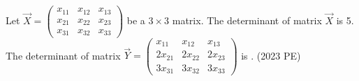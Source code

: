 \item 
Let $\vec{X} = 
\begin{pmatrix}
x_{11} & x_{12} & x_{13} \\
x_{21} & x_{22} & x_{23} \\
x_{31} & x_{32} & x_{33}
\end{pmatrix}
$ be a $3 \times 3$ matrix.
The determinant of matrix $\vec{X}$ is 5.
The determinant of matrix $\vec{Y} = 
\begin{pmatrix}
x_{11} & x_{12} & x_{13} \\
2x_{21} & 2x_{22} & 2x_{23} \\
3x_{31} & 3x_{32} & 3x_{33}
\end{pmatrix}
$ is \underline{\hspace{2cm}}.
\hfill{(2023 PE)}

